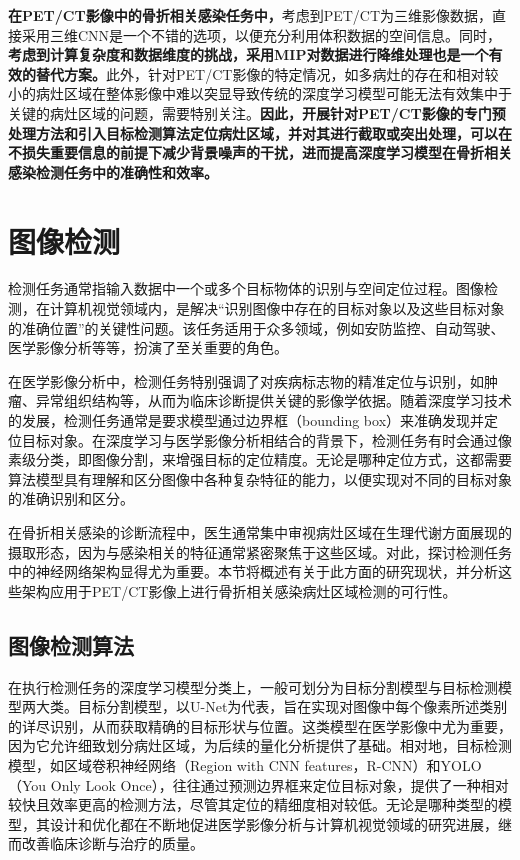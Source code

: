 \textbf{在PET/CT影像中的骨折相关感染任务中，}考虑到PET/CT为三维影像数据，直接采用三维CNN是一个不错的选项，以便充分利用体积数据的空间信息。同时，\textbf{考虑到计算复杂度和数据维度的挑战，采用MIP对数据进行降维处理也是一个有效的替代方案。}此外，针对PET/CT影像的特定情况，如多病灶的存在和相对较小的病灶区域在整体影像中难以突显导致传统的深度学习模型可能无法有效集中于关键的病灶区域的问题，需要特别关注。\textbf{因此，开展针对PET/CT影像的专门预处理方法和引入目标检测算法定位病灶区域，并对其进行截取或突出处理，可以在不损失重要信息的前提下减少背景噪声的干扰，进而提高深度学习模型在骨折相关感染检测任务中的准确性和效率。}

\section{图像检测}

检测任务通常指输入数据中一个或多个目标物体的识别与空间定位过程。图像检测，在计算机视觉领域内，是解决“识别图像中存在的目标对象以及这些目标对象的准确位置”的关键性问题。该任务适用于众多领域，例如安防监控、自动驾驶、医学影像分析等等，扮演了至关重要的角色。

在医学影像分析中，检测任务特别强调了对疾病标志物的精准定位与识别，如肿瘤、异常组织结构等，从而为临床诊断提供关键的影像学依据。随着深度学习技术的发展，检测任务通常是要求模型通过边界框（bounding box）来准确发现并定位目标对象。在深度学习与医学影像分析相结合的背景下，检测任务有时会通过像素级分类，即图像分割，来增强目标的定位精度。无论是哪种定位方式，这都需要算法模型具有理解和区分图像中各种复杂特征的能力，以便实现对不同的目标对象的准确识别和区分。

在骨折相关感染的诊断流程中，医生通常集中审视病灶区域在生理代谢方面展现的摄取形态，因为与感染相关的特征通常紧密聚焦于这些区域。对此，探讨检测任务中的神经网络架构显得尤为重要。本节将概述有关于此方面的研究现状，并分析这些架构应用于PET/CT影像上进行骨折相关感染病灶区域检测的可行性。

\subsection{图像检测算法}

在执行检测任务的深度学习模型分类上，一般可划分为目标分割模型与目标检测模型两大类。目标分割模型，以U-Net\cite{ronneberger2015u}为代表，旨在实现对图像中每个像素所述类别的详尽识别，从而获取精确的目标形状与位置。这类模型在医学影像中尤为重要，因为它允许细致划分病灶区域，为后续的量化分析提供了基础。相对地，目标检测模型，如区域卷积神经网络（Region with CNN features，R-CNN）\cite{girshick2014rich}和YOLO（You Only Look Once）\cite{redmon2016you}，往往通过预测边界框来定位目标对象，提供了一种相对较快且效率更高的检测方法，尽管其定位的精细度相对较低。无论是哪种类型的模型，其设计和优化都在不断地促进医学影像分析与计算机视觉领域的研究进展，继而改善临床诊断与治疗的质量。

